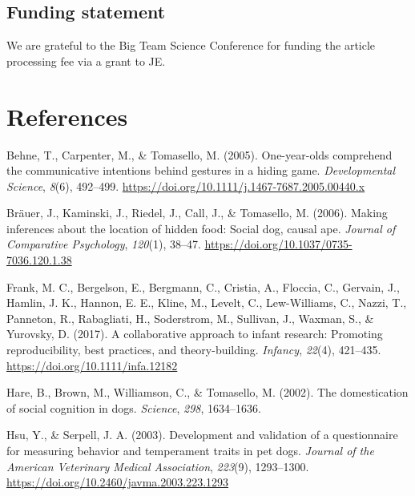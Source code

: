 \documentclass[
  man,floatsintext]{apa6}
\newlength{\cslhangindent}
\newlength{\cslentryspacingunit} %
\newenvironment{CSLReferences}[2] %
 {%
  \setlength{\parindent}{0pt}
  \ifodd #1
  \let\oldpar\par
  \def\par{\hangindent=\cslhangindent\oldpar}
  \fi
  \setlength{\parskip}{#2\cslentryspacingunit}
 }%
 {}
\begin{document}
\hypertarget{funding-statement}{%
\subsection{Funding statement}\label{funding-statement}}

We are grateful to the Big Team Science Conference for funding the article processing fee via a grant to JE.

\newpage

\hypertarget{references}{%
\section{References}\label{references}}

\hypertarget{refs}{}
\begin{CSLReferences}{1}{0}
\leavevmode{}%
Behne, T., Carpenter, M., \& Tomasello, M. (2005). One-year-olds comprehend the communicative intentions behind gestures in a hiding game. \emph{Developmental Science}, \emph{8}(6), 492--499. \url{https://doi.org/10.1111/j.1467-7687.2005.00440.x}

\leavevmode{}%
Bräuer, J., Kaminski, J., Riedel, J., Call, J., \& Tomasello, M. (2006). Making inferences about the location of hidden food: {Social} dog, causal ape. \emph{Journal of Comparative Psychology}, \emph{120}(1), 38--47. \url{https://doi.org/10.1037/0735-7036.120.1.38}

\leavevmode{}%
Frank, M. C., Bergelson, E., Bergmann, C., Cristia, A., Floccia, C., Gervain, J., Hamlin, J. K., Hannon, E. E., Kline, M., Levelt, C., Lew-Williams, C., Nazzi, T., Panneton, R., Rabagliati, H., Soderstrom, M., Sullivan, J., Waxman, S., \& Yurovsky, D. (2017). A collaborative approach to infant research: Promoting reproducibility, best practices, and theory-building. \emph{Infancy}, \emph{22}(4), 421--435. \url{https://doi.org/10.1111/infa.12182}

\leavevmode{}%
Hare, B., Brown, M., Williamson, C., \& Tomasello, M. (2002). The domestication of social cognition in dogs. \emph{Science}, \emph{298}, 1634--1636.

\leavevmode{}%
Hsu, Y., \& Serpell, J. A. (2003). Development and validation of a questionnaire for measuring behavior and temperament traits in pet dogs. \emph{Journal of the American Veterinary Medical Association}, \emph{223}(9), 1293--1300. \url{https://doi.org/10.2460/javma.2003.223.1293}


\end{CSLReferences}
\end{document}
